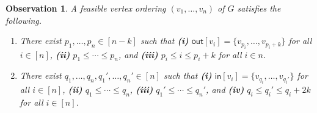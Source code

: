\documentclass[11pt]{article}
\newtheorem{observation}{Observation}
\begin{document}
\begin{observation} \label{obs-vertex}
    A feasible vertex ordering $(v_1,\dots,v_n)$ of $G$ satisfies the following.
    \begin{enumerate}
        \item There exist $p_1,\dots,p_n \in [n-k]$ such that \textnormal{\bf (i)} $\mathsf{out}[v_i] = \{v_{p_i},\dots,v_{p_i+k}\}$ for all $i \in [n]$, \textnormal{\bf (ii)} $p_1 \leq \cdots \leq p_n$, and \textnormal{\bf (iii)} $p_i \leq i \leq p_i+k$ for all $i \in n$.
        \item There exist $q_1,\dots,q_n,q_1',\dots,q_n' \in [n]$ such that \textnormal{\bf (i)} $\mathsf{in}[v_i] = \{v_{q_i},\dots,v_{q_i'}\}$ for all $i \in [n]$, \textnormal{\bf (ii)} $q_1 \leq \cdots \leq q_n$, \textnormal{\bf (iii)} $q_1' \leq \cdots \leq q_n'$, and \textnormal{\bf (iv)} $q_i \leq q_i' \leq q_i+2k$ for all $i \in [n]$.
    \end{enumerate}
\end{observation}
\end{document}
